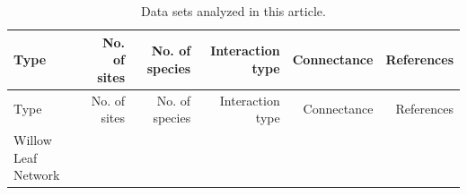 \begin{landscape}

\begin{longtable}[]{@{}lrrrrr@{}}
\caption{Data sets analyzed in this article.
\label{tbl:datasets}}\tabularnewline
\toprule
\begin{minipage}[b]{0.18\columnwidth}\raggedright\strut
Type\strut
\end{minipage} & \begin{minipage}[b]{0.08\columnwidth}\raggedleft\strut
No. of sites\strut
\end{minipage} & \begin{minipage}[b]{0.09\columnwidth}\raggedleft\strut
No. of species\strut
\end{minipage} & \begin{minipage}[b]{0.13\columnwidth}\raggedleft\strut
Interaction type\strut
\end{minipage} & \begin{minipage}[b]{0.08\columnwidth}\raggedleft\strut
Connectance\strut
\end{minipage} & \begin{minipage}[b]{0.27\columnwidth}\raggedleft\strut
References\strut
\end{minipage}\tabularnewline
\midrule
\endfirsthead
\toprule
\begin{minipage}[b]{0.18\columnwidth}\raggedright\strut
Type\strut
\end{minipage} & \begin{minipage}[b]{0.08\columnwidth}\raggedleft\strut
No. of sites\strut
\end{minipage} & \begin{minipage}[b]{0.09\columnwidth}\raggedleft\strut
No. of species\strut
\end{minipage} & \begin{minipage}[b]{0.13\columnwidth}\raggedleft\strut
Interaction type\strut
\end{minipage} & \begin{minipage}[b]{0.08\columnwidth}\raggedleft\strut
Connectance\strut
\end{minipage} & \begin{minipage}[b]{0.27\columnwidth}\raggedleft\strut
References\strut
\end{minipage}\tabularnewline
\midrule
\endhead
\begin{minipage}[t]{0.18\columnwidth}\raggedright\strut
Willow Leaf Network\strut
\end{minipage} & \begin{minipage}[t]{0.08\columnwidth}\raggedleft\strut

\end{minipage}
\end{longtable}
\end{landscape}

